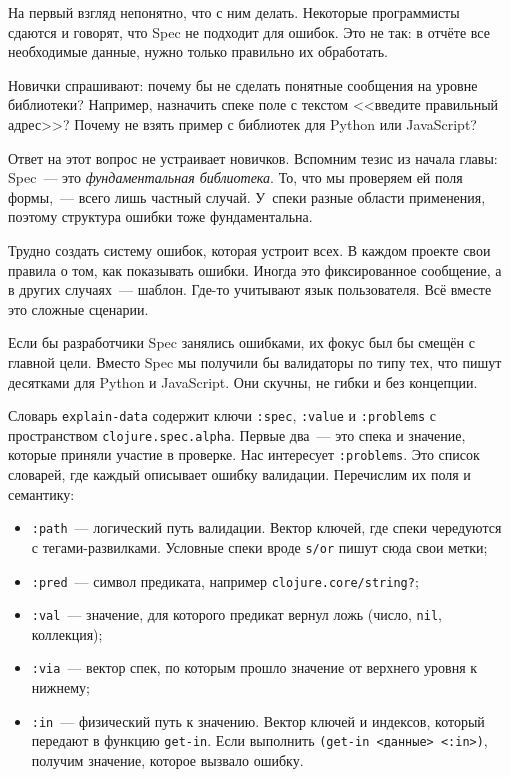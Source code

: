 
На первый взгляд непонятно, что с ним делать. Некоторые программисты сдаются и
говорят, что Spec не подходит для ошибок. Это не так: в отчёте все
необходимые данные, нужно только правильно их обработать.

Новички спрашивают: почему бы не сделать понятные сообщения на уровне
библиотеки? Например, назначить спеке поле с текстом <<введите правильный
адрес>>? Почему не взять пример с библиотек для Python или JavaScript?


Ответ на этот вопрос не устраивает новичков. Вспомним тезис из начала главы:
Spec~--- это \emph{фундаментальная библиотека}. То, что мы проверяем ей поля
формы,~--- всего лишь частный случай. У~спеки разные области применения, поэтому
структура ошибки тоже фундаментальна.

Трудно создать систему ошибок, которая устроит всех. В каждом проекте свои
правила о том, как показывать ошибки. Иногда это фиксированное сообщение, а в
других случаях~--- шаблон. Где-то учитывают язык пользователя. Всё вместе это
сложные сценарии.

Если бы разработчики Spec занялись ошибками, их фокус был бы смещён с главной
цели. Вместо Spec мы получили бы валидаторы по типу тех, что пишут десятками для
Python и JavaScript. Они скучны, не гибки и без концепции.

Словарь \verb|explain-data| содержит ключи \verb|:spec|, \verb|:value| и
\verb|:problems| с пространством \verb|clojure.spec.alpha|. Первые два~--- это
спека и значение, которые приняли участие в проверке. Нас интересует
\verb|:problems|. Это список словарей, где каждый описывает ошибку
валидации. Перечислим их поля и семантику:


\begin{itemize}

\item
  \verb|:path|~--- логический путь валидации. Вектор ключей, где спеки
  чередуются с тегами-развилками. Условные спеки вроде \verb|s/or| пишут сюда
  свои метки;

\item
  \verb|:pred|~--- символ предиката, например \texttt{clo\-ju\-re.\-core/\-string?};

\item
  \verb|:val|~--- значение, для которого предикат вернул ложь (число,
  \verb|nil|, коллекция);

\item
  \verb|:via|~--- вектор спек, по которым прошло значение от верхнего уровня к
  нижнему;

\item
  \verb|:in|~--- физический путь к значению. Вектор ключей и индексов, который
  передают в функцию \verb|get-in|. Если выполнить \verb|(get-in <данные> <:in>)|,
  получим значение, которое вызвало ошибку.

\end{itemize}

